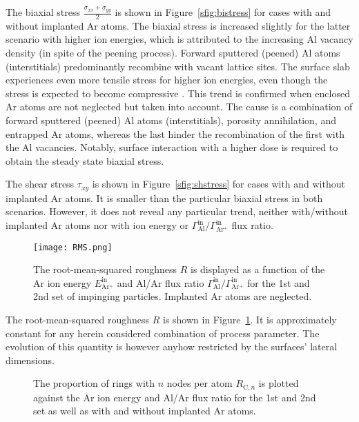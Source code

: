 \documentclass[12pt,a4paper,preprint,superscriptaddress]{revtex4-1}
\begin{document}
The biaxial stress $\frac{\sigma_{xx}+\sigma_{yy}}{2}$ is shown in Figure~\ref{sfig:bistress} for cases with and without implanted Ar atoms. The biaxial stress is increased slightly for the latter scenario with higher ion energies, which is attributed to the increasing Al vacancy density (in spite of the peening process). Forward sputtered (peened) Al atoms (interstitials) predominantly recombine with vacant lattice sites. The surface slab experiences even more tensile stress for higher ion energies, even though the stress is expected to become compressive \citep{kim1998study,abadias2018stress,d1989note,windischmann1992intrinsic}. This trend is confirmed when enclosed Ar atoms are not neglected but taken into account. The cause is a combination of forward sputtered (peened) Al atoms (interstitials), porosity annihilation, and entrapped Ar atoms, whereas the last hinder the recombination of the first with the Al vacancies. Notably, surface interaction with a higher dose is required to obtain the steady state biaxial stress.

The shear stress $\tau_{xy}$ is shown in Figure~\ref{sfig:shstress} for cases with and without implanted Ar atoms. It is smaller than the particular biaxial stress in both scenarios. However, it does not reveal any particular trend, neither with/without implanted Ar atoms nor with ion energy or $\Gamma_\mathrm{Al}^\mathrm{in}/\Gamma_\mathrm{Ar^+}^\mathrm{in}$ flux ratio.

\begin{figure}[t]
\texttt{[image: RMS.png]}
\caption{The root-mean-squared roughness $R$ is displayed as a function of the Ar ion energy $E_\mathrm{Ar^+}^\mathrm{in}$ and Al/Ar flux ratio $\Gamma_\mathrm{Al}^\mathrm{in}/\Gamma_\mathrm{Ar^+}^\mathrm{in}$ for the 1st and 2nd set of impinging particles. Implanted Ar atoms are neglected.}
\label{fig:RMS}
\end{figure}

The root-mean-squared roughness $R$ is shown in Figure~\ref{fig:RMS}. It is approximately constant for any herein considered combination of process parameter. The evolution of this quantity is however anyhow restricted by the surfaces' lateral dimensions.

\begin{figure}[t]
\hfill
{}\hfill
{}\hfill
{}
\caption{The proportion of rings with $n$ nodes per atom $R_{\mathrm{C},n}$ is plotted against the Ar ion energy and Al/Ar flux ratio for the 1st and 2nd set as well as with and without implanted Ar atoms.}
\label{fig:ringRc}
\end{figure}
\end{document}

